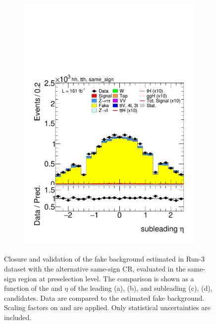 \begin{figure}[htbp]
\begin{subfigure}[b]{0.45\textwidth}
    \includegraphics[width=\textwidth]{images/same_sign_same_sign_run3/plot_tau_1_eta_hh_tth_22_23_24_same_sign.pdf}
    \caption{}
  \end{subfigure}
  \caption{
    Closure and validation of the fake \tauhad background estimated in Run-3 dataset with the alternative same-sign \tauhadhad CR, evaluated in the same-sign region at preselection level.
    The comparison is shown as a function of the \pt and $\eta$ of the leading (a), (b), and subleading (c), (d), \tauhad candidates. 
    Data are compared to the estimated fake \tauhad background. Scaling factors on \ztautau and \ttbar are applied. Only statistical uncertainties are included.
  }
  \label{fig:closure_validation_same_sign_run3}
\end{figure}
  

